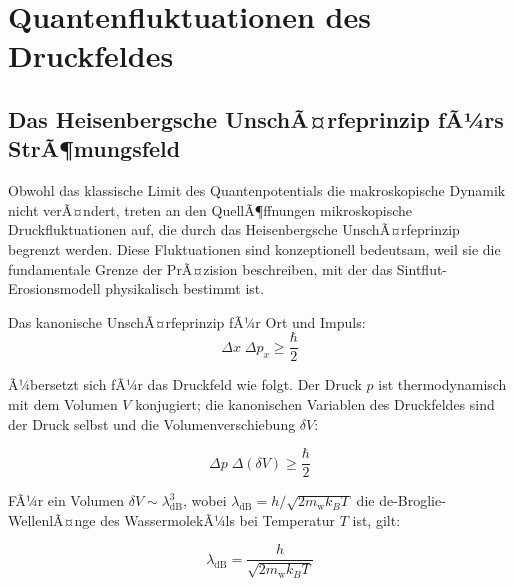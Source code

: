 ﻿\documentclass[12pt,a4paper]{report}
\begin{document}
\section{Quantenfluktuationen des Druckfeldes}
\label{sec:qfluktuationen}

\subsection{Das Heisenbergsche UnschÃ¤rfeprinzip fÃ¼rs StrÃ¶mungsfeld}

Obwohl das klassische Limit des Quantenpotentials die makroskopische Dynamik nicht verÃ¤ndert, treten an den QuellÃ¶ffnungen mikroskopische Druckfluktuationen auf, die durch das Heisenbergsche UnschÃ¤rfeprinzip begrenzt werden. Diese Fluktuationen sind konzeptionell bedeutsam, weil sie die fundamentale Grenze der PrÃ¤zision beschreiben, mit der das Sintflut-Erosionsmodell physikalisch bestimmt ist.

Das kanonische UnschÃ¤rfeprinzip fÃ¼r Ort und Impuls:
\begin{equation}
	\Delta x\;\Delta p_x \geq \frac{\hbar}{2}
	\label{eq:heisenberg_xp}
\end{equation}

Ã¼bersetzt sich fÃ¼r das Druckfeld wie folgt. Der Druck $p$ ist thermodynamisch mit dem Volumen $V$ konjugiert; die kanonischen Variablen des Druckfeldes sind der Druck selbst und die Volumenverschiebung $\delta V$:

\begin{equation}
	\Delta p\;\Delta(\delta V) \geq \frac{\hbar}{2}
	\label{eq:heisenberg_pV}
\end{equation}

FÃ¼r ein Volumen $\delta V \sim \lambda_\mathrm{dB}^3$, wobei $\lambda_\mathrm{dB} = h/\sqrt{2m_\mathrm{w}k_BT}$ die de-Broglie-WellenlÃ¤nge des WassermolekÃ¼ls bei Temperatur $T$ ist, gilt:

\begin{equation}
	\lambda_\mathrm{dB} = \frac{h}{\sqrt{2m_\mathrm{w}k_BT}}
	\label{eq:de_broglie}
\end{equation}
\end{document}

